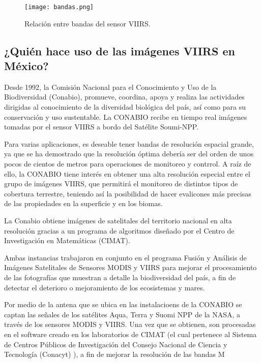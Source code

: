 \begin{figure}[ht!]

\centering
\texttt{[image: bandas.png]}
\caption{Relación entre bandas del sensor VIIRS.} \label{bandas_relation}
\end{figure}

\subsection{¿Quién hace uso de las imágenes VIIRS en México?}

Desde 1992, la Comisión Nacional para el Conocimiento y Uso de la Biodiversidad (Conabio), promueve, coordina, apoya y realiza las actividades dirigidas al conocimiento de la diversidad biológica del país, así como para su conservación y uso sustentable. La CONABIO recibe en tiempo real imágenes tomadas por el sensor VIIRS a bordo del Satélite Soumi-NPP. 

Para varias aplicaciones, es deseable tener bandas de resolución espacial grande, ya que se ha demostrado que la resolución óptima debería ser del orden de unos pocos de cientos de metros para operaciones de monitoreo y contrrol. A raíz de ello, la CONABIO tiene interés en obtener una alta resolución especial entre el grupo de imágenes VIIRS, que permitirá el monitoreo de distintos tipos de cobertura terrestre, teniendo así la posibilidad de hacer evalicones más precisas de las propiedades en la superficie y en los biomas. 

La Conabio obtiene imágenes de satelitales del territorio nacional en alta resolución gracias a un programa de algoritmos diseñado por el Centro de Investigación en Matemáticas (CIMAT).

Ambas instancias trabajaron en conjunto en el programa Fusión y Análisis de Imágenes Satelitales de Sensores MODIS y VIIRS para mejorar el procesamiento de las fotografías que muestran a detalle la biodiversidad del país, a fin de detectar el deterioro o mejoramiento de los ecosistemas y mares. 

Por medio de la antena que se ubica en las instalacioens de la CONABIO se captan las señales de los satélites Aqua, Terra y Suomi NPP de la NASA, a través de los sensores MODIS y VIIRS. Una vez que se obtienen, son procesadas en el software creado en los laboratorios de CIMAT (el cual pertenece al Sistema de Centros Públicos de Investigación del Consejo Nacional de Ciencia y Tecnología (Conacyt) ), a fin de mejorar la resolución de las bandas M  


